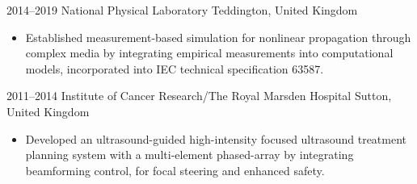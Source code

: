 \documentclass[english, print]{cv-style-wide}
\begin{document}
\begin{entrylist}

\entry
  {2014--2019}
  {National Physical Laboratory}
  {Teddington, United Kingdom}
  {
  \begin{itemize}
\item Established measurement-based simulation for nonlinear propagation through complex media by integrating empirical measurements into computational models, incorporated into IEC technical specification 63587.
  \end{itemize}}


\entry
  {2011--2014}
  {Institute of Cancer Research/The Royal Marsden Hospital}
  {Sutton, United Kingdom}
  {
    \begin{itemize}
    \item Developed an ultrasound-guided high-intensity focused ultrasound treatment planning system with a multi-element phased-array by integrating beamforming control, for focal steering and enhanced safety.
    \end{itemize}}



\end{entrylist}
\end{document}
